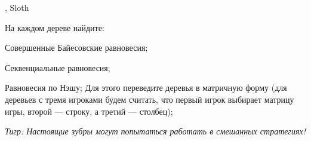 \begin{problem}[Лес ]\par
\begin{source} \cite{colell:mt}, Sloth \end{source}
На каждом дереве найдите:\par
Совершенные Байесовские равновесия;\par
Секвенциальные равновесия;\par
Равновесия по Нэшу; Для этого переведите деревья в матричную форму (для деревьев с тремя игроками будем считать, что первый игрок выбирает матрицу игры, второй --- строку, а третий --- столбец);\par
%
%
%




{\it Тигр: Настоящие зубры могут попытаться работать в смешанных стратегиях!}\par





\end{problem}
